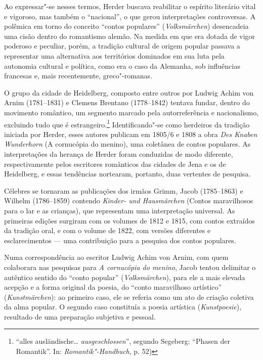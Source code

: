 Ao expressar"-se nesses termos, Herder buscava reabilitar o espírito
literário vital e vigoroso, mas também o ``nacional'', o que gerou
interpretações controversas. A polêmica em torno do conceito ``contos
populares'' (\textit{Volksmärchen}) desencadeia uma cisão dentro 
do romantismo alemão. Na medida em que era dotada de vigor poderoso 
e peculiar, porém, a tradição cultural de origem popular passava a 
representar uma alternativa aos territórios dominados em sua luta 
pela autonomia cultural e política, como era o caso da Alemanha, 
sob influências francesas e, mais recentemente, greco"-romanas.

O grupo da cidade de Heidelberg, composto entre outros por Ludwig Achim
von Arnim (1781--1831) e Clemens Brentano (1778--1842) tentava fundar,
dentro do movimento romântico, um segmento marcado pela autorreferência
e nacionalismo, excluindo tudo que é estrangeiro.\footnote{ ``alles
ausländische\ldots{} \textit{ausgeschlossen}'', segundo Segeberg: ``Phasen der
Romantik''. In: \textit{Romantik"-Handbuch}, p. 52)} Identificando"-se
como herdeiros da tradição iniciada por Herder, esses autores publicam
em 1805/6 e 1808 a obra \textit{Des Knaben Wunderhorn} (A cornucópia
do menino), uma coletânea de contos populares. As interpretações da
herança de Herder foram conduzidas de modo diferente, respectivamente
pelos escritores românticos das cidades de Jena e os de Heidelberg, e
essas tendências nortearam, portanto, duas vertentes de pesquisa. 

Célebres se tornaram as publicações dos irmãos Grimm, Jacob (1785--1863)
e Wilhelm (1786--1859) contendo \textit{Kinder- und Hausmärchen}
(Contos maravilhosos para o lar e as crianças), que
representam uma interpretação universal. As primeiras edições surgiram
com os volumes de 1812 e 1815, com contos extraídos da tradição oral, e
com o volume de 1822, com versões diferentes e esclarecimentos — uma
contribuição para a pesquisa dos contos populares.

Numa correspondência ao escritor Ludwig Achim von Arnim, com quem
colaborara nas pesquisas para \textit{A cornucópia do menino}, Jacob tentou
delimitar o autêntico sentido do ``conto popular'' (\textit{Volksmärchen}), para
ele a mais elevada acepção e a forma original da poesia, do ``conto maravilhoso
artístico'' (\textit{Kunstmärchen}): ao primeiro caso, ele se referia como um ato
de criação coletiva da alma popular. O segundo caso constituía a poesia
artística (\textit{Kunstpoesie}), resultado de uma preparação subjetiva e pessoal. 

